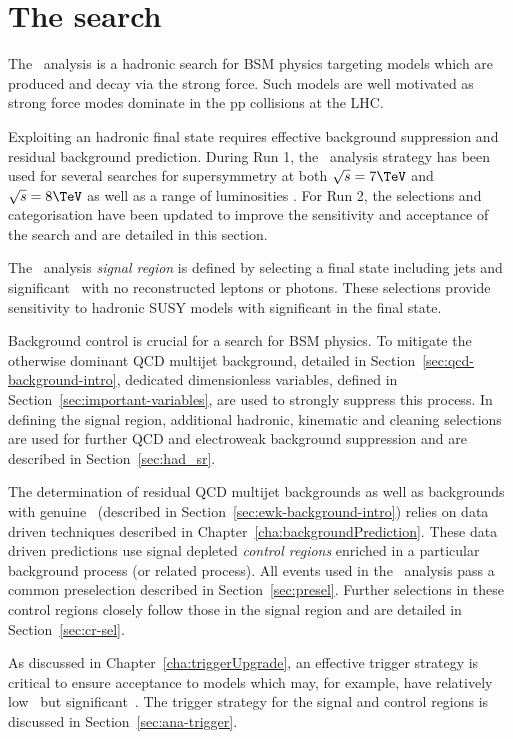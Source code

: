 \chapter{The \alphat search}
\label{cha:alphat}

The \alphat~analysis is a hadronic search for BSM physics 
targeting models which are produced and decay via the strong force.
Such models are well motivated as strong force modes dominate 
in the pp collisions at the LHC. 

Exploiting an hadronic final state requires effective 
background suppression and residual background prediction. During Run 1, 
the \alphat~analysis strategy has been used for several searches for supersymmetry at
both $\sqrt{s} = 7 \TeV$ and $\sqrt{s} = 8 \TeV$ as well as a range of luminosities
\cite{alphaT1,alphaT2,alphaT3,alphaT4}. For Run 2, the selections and categorisation 
have been updated to improve the sensitivity and acceptance of the search and are detailed
in this section.

The \alphat~analysis \emph{signal region} is defined by selecting a final state 
including jets and significant \met~with no reconstructed leptons or photons. 
These selections provide sensitivity to hadronic SUSY models with significant \met
in the final state.

Background control is crucial for a search for BSM physics. To mitigate the otherwise 
dominant QCD multijet background, detailed in Section~\ref{sec:qcd-background-intro}, dedicated dimensionless variables, 
defined in Section~\ref{sec:important-variables}, are used to strongly suppress this process.
In defining the signal region, additional hadronic, kinematic and cleaning selections 
are used for further QCD and electroweak background suppression and are described in 
Section~\ref{sec:had_sr}.

The determination of residual QCD multijet backgrounds as well as backgrounds with 
genuine \met~(described in Section~\ref{sec:ewk-background-intro}) relies on data driven techniques 
described in Chapter~\ref{cha:backgroundPrediction}. These data driven predictions use signal 
depleted \emph{control regions} enriched in a particular background process 
(or related process). All events used in the \alphat~analysis pass
a common preselection described in Section~\ref{sec:presel}. Further selections in
these control regions closely follow those in the signal region and are detailed in 
Section~\ref{sec:cr-sel}.

As discussed in Chapter~\ref{cha:triggerUpgrade}, an effective trigger strategy is 
critical to ensure acceptance to models which may, for example, have relatively low
\scalht~but significant~\mht. The trigger strategy for the signal and control regions
is discussed in Section~\ref{sec:ana-trigger}.

